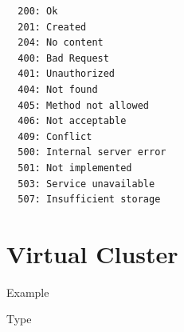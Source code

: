 \documentclass[11pt]{article}
\begin{document}
\begin{verbatim}
  200: Ok
  201: Created
  204: No content
  400: Bad Request
  401: Unauthorized
  404: Not found
  405: Method not allowed
  406: Not acceptable
  409: Conflict
  500: Internal server error
  501: Not implemented
  503: Service unavailable
  507: Insufficient storage
\end{verbatim}

\section{Virtual Cluster}

Example

\begin{quote}

\end{quote}

Type

\begin{quote}

\end{quote}
\end{document}
